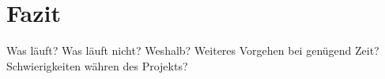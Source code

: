\chapter{Fazit}
\label{chap:fazit}

Was  l\"auft? Was  l\"auft  nicht? Weshalb? Weiteres Vorgehen  bei  gen\"ugend
Zeit? Schwierigkeiten w\"ahren des Projekts?
